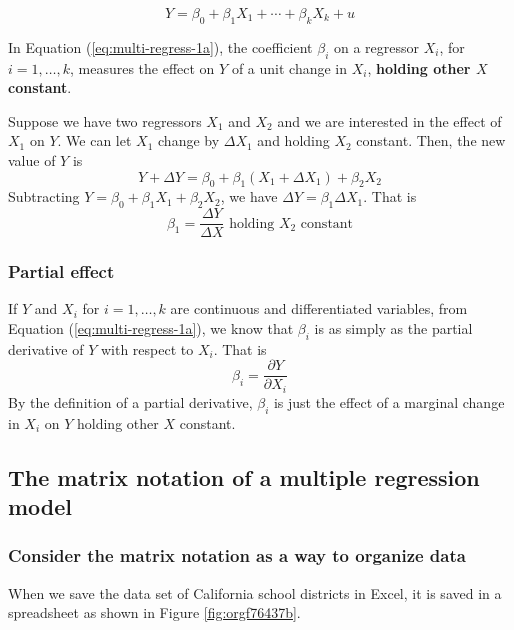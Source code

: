 \documentclass[a4paper,11pt]{article}
\begin{document}
\begin{equation}
\label{eq:multi-regress-1a}
Y = \beta_0 + \beta_1 X_1 + \cdots + \beta_k X_k + u
\end{equation}

In Equation (\ref{eq:multi-regress-1a}), the coefficient \(\beta_i\) on
a regressor \(X_i\), for \(i=1, \ldots, k\), measures the effect on \(Y\) of a
unit change in \(X_i\), \textbf{holding other \(X\) constant}. 

Suppose we have two regressors \(X_1\) and \(X_2\) and we are interested
in the effect of \(X_1\) on \(Y\). We can let \(X_1\) change by \(\Delta X_1\)
and holding \(X_2\) constant. Then, the new value of \(Y\) is
\[ 
Y + \Delta Y = \beta_0 + \beta_1 (X_1 + \Delta X_1) + \beta_2 X_2  
\]
Subtracting \(Y = \beta_0 + \beta_1 X_1 + \beta_2 X_2\), we have
\(\Delta Y = \beta_1 \Delta X_1\). That is
\[ \beta_1 = \frac{\Delta Y}{\Delta X} \text{ holding } X_2 \text{ constant} \]

\subsubsection*{Partial effect}
\label{sec:orgaede3d1}

If \(Y\) and \(X_i\) for \(i = 1, \ldots, k\) are continuous and
differentiated variables, from Equation (\ref{eq:multi-regress-1a}),
we know that \(\beta_i\) is as simply as the partial derivative of \(Y\) with
respect to \(X_i\). That is \[\beta_i = \frac{\partial Y}{\partial
X_i}\] By the definition of a partial derivative, \(\beta_i\) is just
the effect of a marginal change in \(X_i\) on \(Y\) holding other \(X\)
constant.


\subsection{The matrix notation of a multiple regression model}
\label{sec:org109c902}

\subsubsection*{Consider the matrix notation as a way to organize data}
\label{sec:org963ab6b}

When we save the data set of California school districts in Excel, it
is saved in a spreadsheet as shown in Figure \ref{fig:orgf76437b}.
\end{document}
